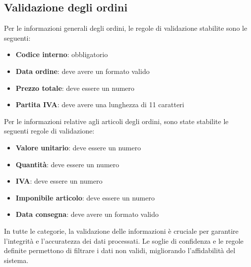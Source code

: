 \subsection{Validazione degli ordini}
\label{subsec:validazione-ordini}
Per le informazioni generali degli ordini, le regole di validazione stabilite sono le seguenti:

\begin{itemize}
    \item \textbf{Codice interno}: obbligatorio
    \item \textbf{Data ordine}: deve avere un formato valido
    \item \textbf{Prezzo totale}: deve essere un numero
    \item \textbf{Partita IVA}: deve avere una lunghezza di 11 caratteri
\end{itemize}

Per le informazioni relative agli articoli degli ordini, sono state stabilite le seguenti regole di validazione:

\begin{itemize}
    \item \textbf{Valore unitario}: deve essere un numero
    \item \textbf{Quantità}: deve essere un numero
    \item \textbf{IVA}: deve essere un numero
    \item \textbf{Imponibile articolo}: deve essere un numero
    \item \textbf{Data consegna}: deve avere un formato valido
\end{itemize}

In tutte le categorie, la validazione delle informazioni è cruciale per garantire l'integrità e l'accuratezza dei dati processati. Le soglie di confidenza e le regole definite permettono di filtrare i dati non validi, migliorando l'affidabilità del sistema.

